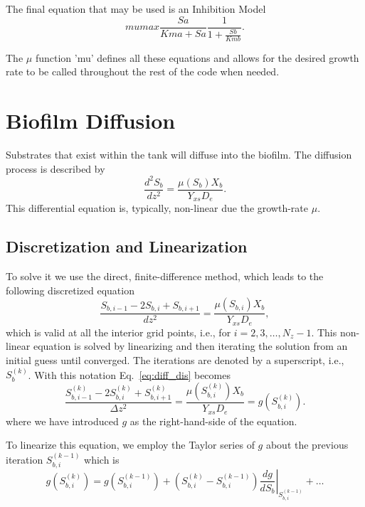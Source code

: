 \documentclass[letterpaper, twoside]{article}
\newcommand{\ie}{i.e.}
\begin{document}
The final equation that may be used is an Inhibition Model
\begin{equation} \label{eq: Inhibition}
  mumax \frac{Sa}{Kma + Sa} \frac{1}{1 + \frac{Sb}{Kmb}}.
\end{equation}

The $\mu$ function 'mu' defines all these equations and allows for the desired growth rate to be called throughout the rest of the code when needed.
  

\section{Biofilm Diffusion}
Substrates that exist within the tank will diffuse into the biofilm.  The diffusion process is described by
\begin{equation} \label{eq:diffusion}
  \frac{d^2 S_b}{dz^2} = \frac{\mu(S_b) X_b}{Y_{xs} D_e}.
\end{equation}
This differential equation is, typically, non-linear due the growth-rate $\mu$.

\subsection{Discretization and Linearization}
To solve it we use the direct, finite-difference method, which leads to the following discretized equation
\begin{equation} \label{eq:diff_dis}
  \frac{ S_{b,i-1} - 2 S_{b,i} + S_{b,i+1}}{dz^2} = \frac{\mu(S_{b,i}) X_b}{Y_{xs} D_e},
\end{equation}
which is valid at all the interior grid points, \ie, for $i=2,3,\dots,N_z-1$. 
This non-linear equation is solved by linearizing and then iterating the solution from an initial guess until converged.
The iterations are denoted by a superscript, \ie, $S_{b}^{(k)}$.  With this notation Eq.~\ref{eq:diff_dis} becomes
\begin{equation} \label{eq:diff_dis_iter}
  \frac{ S_{b,i-1}^{(k)} - 2 S_{b,i}^{(k)} + S_{b,i+1}^{(k)}}{\Delta z^2} = \frac{\mu\left(S_{b,i}^{(k)}\right) X_b}{Y_{xs} D_e} =  g\left(S_{b,i}^{(k)}\right).
\end{equation}
where we have introduced $g$ as the right-hand-side of the equation.

To linearize this equation, we employ the Taylor series of $g$ about the previous iteration $S_{b,i}^{(k-1)}$ which is
\begin{equation}\label{eq:TaylorSeries}
  g\left(S_{b,i}^{(k)}\right) =   g\left(S_{b,i}^{(k-1)}\right) + \left( S_{b,i}^{(k)} - S_{b,i}^{(k-1)}\right) \left.\frac{d g}{d S_b}\right|_{S_{b,i}^{(k-1)}} + \dots
\end{equation}
\end{document}
